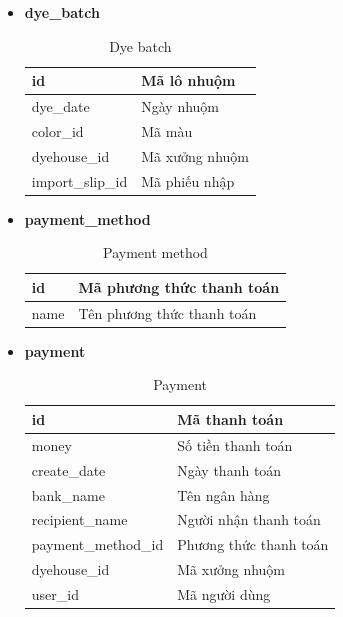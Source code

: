 \begin{itemize}
    \item \textbf{dye\_batch}
    \begin{table}[H]
        \centering
        \begin{tabular}{|m{3cm}|m{10cm}|}
        \hline 
            id & Mã lô nhuộm\\ \hline
            dye\_date & Ngày nhuộm\\ \hline
            color\_id & Mã màu \\ \hline
            dyehouse\_id & Mã xưởng nhuộm\\ \hline
            import\_slip\_id & Mã phiếu nhập\\ 
        \hline 
        \end{tabular}
        \caption{Dye batch}
        \label{dye_batch}
    \end{table}
    
    \item \textbf{payment\_method}
    \begin{table}[H]
        \centering
        \begin{tabular}{|m{3cm}|m{10cm}|}
        \hline 
            id & Mã phương thức thanh toán\\ \hline
            name & Tên phương thức thanh toán\\ 
        \hline 
        \end{tabular}
        \caption{Payment method}
        \label{payment_method}
    \end{table}
    
    \item \textbf{payment}
    \begin{table}[H]
        \centering
        \begin{tabular}{|m{3.5cm}|m{10cm}|}
        \hline 
            id & Mã thanh toán\\ \hline
            money & Số tiền thanh toán\\ \hline
            create\_date & Ngày thanh toán \\ \hline
            bank\_name & Tên ngân hàng\\ \hline
            recipient\_name & Người nhận thanh toán\\ \hline
            payment\_method\_id & Phương thức thanh toán \\ \hline
            dyehouse\_id & Mã xưởng nhuộm\\ \hline
            user\_id & Mã người dùng\\ 
        \hline 
        \end{tabular}
        \caption{Payment}
        \label{payment}
    \end{table}
    

\end{itemize}
